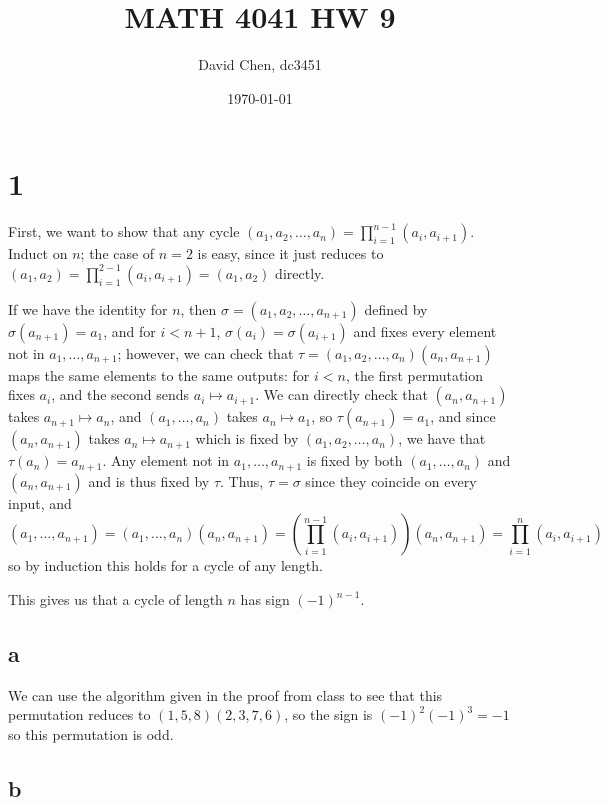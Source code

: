 \documentclass[12pt,letterpaper]{article}
\title{MATH 4041 HW 9}
\author{David Chen, dc3451}
\date{\today}
\theoremstyle{definition}
\begin{document}
\maketitle

\section*{1}

First, we want to show that any cycle $(a_{1}, a_{2}, \dots, a_{n}) = \prod_{i=1}^{n-1}(a_{i}, a_{i+1})$. Induct on $n$; the case of $n = 2$ is easy, since it just reduces to $(a_{1}, a_{2}) = \prod_{i=1}^{2-1}(a_{i},a_{i+1}) = (a_{1}, a_{2})$ directly.

If we have the identity for $n$, then $\sigma = (a_{1}, a_{2}, \dots, a_{n+1})$ defined by $\sigma(a_{n+1}) = a_{1}$, and for $i < n+1$, $\sigma(a_{i}) = \sigma(a_{i+1})$ and fixes every element not in $a_{1}, \dots, a_{n+1}$; however, we can check that $\tau = (a_{1}, a_{2}, \dots, a_{n})(a_{n}, a_{n+1})$ maps the same elements to the same outputs: for $i < n$, the first permutation fixes $a_{i}$, and the second sends $a_{i} \mapsto a_{i+1}$. We can directly check that $(a_{n}, a_{n+1})$ takes $a_{n+1} \mapsto a_{n}$, and $(a_{1},\dots, a_{n})$ takes $a_{n} \mapsto a_{1}$, so $\tau(a_{n+1}) = a_{1}$, and since $(a_{n}, a_{n+1})$ takes $a_{n} \mapsto a_{n+1}$ which is fixed by $(a_{1}, a_{2}, \dots, a_{n})$, we have that $\tau(a_{n}) = a_{n+1}$. Any element not in $a_{1}, \dots, a_{n+1}$ is fixed by both $(a_{1}, \dots, a_{n})$ and $(a_{n}, a_{n+1})$ and is thus fixed by $\tau$. Thus, $\tau = \sigma$ since they coincide on every input, and
\[
  (a_{1},\dots, a_{n+1}) = (a_{1}, \dots, a_{n})(a_{n}, a_{n+1}) = \left(\prod_{i=1}^{n-1}(a_{i},a_{i+1})\right) (a_{n},a_{n+1}) = \prod_{i=1}^{n}(a_{i},a_{i+1})
\]
so by induction this holds for a cycle of any length.

This gives us that a cycle of length $n$ has sign $(-1)^{n-1}$.

\subsection*{a}

We can use the algorithm given in the proof from class to see that this permutation reduces to $(1,5,8)(2,3,7,6)$, so the sign is $(-1)^{2}(-1)^{3} = -1$ so this permutation is odd.

\subsection*{b}
\end{document}
